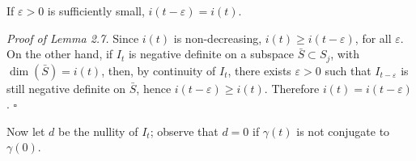 \begin{lemma}
  \label{lem:dc-ch11-2-7}
  If $\varepsilon>0$ is sufficiently small, $i(t-\varepsilon)=i(t)$.
  
  \emph{Proof of Lemma 2.7.} Since $i(t)$ is non-decreasing,
  $i(t)\geq i(t-\varepsilon)$, for all $\varepsilon$. On the other hand, if $I_t$
  is negative definite on a subspace $\bar S\subset S_j$, with $\dim(\bar S)=i(t)$,
  then, by continuity of $I_t$, there exists $\varepsilon>0$ such that
  $I_{t-\varepsilon}$ is still negative definite on $\bar S$, hence
  $i(t-\varepsilon)\geq i(t)$. Therefore $i(t)=i(t-\varepsilon)$. $\square$
  
  Now let $d$ be the nullity of $I_t$; observe that $d=0$ if $\gamma(t)$ is not
  conjugate to $\gamma(0)$.
\end{lemma}

